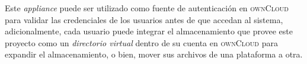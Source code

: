 \begin{itemize}
Este \textsl{appliance} puede ser utilizado como fuente de autenticaci\'{o}n en \textsc{ownCloud} para validar las credenciales de los usuarios antes de que accedan al sistema, adicionalmente, cada usuario puede integrar el almacenamiento que provee este proyecto como un \textsl{directorio virtual} dentro de su cuenta en \textsc{ownCloud} para expandir el almacenamiento, o bien, mover sus archivos de una plataforma a otra.

%

\end{itemize}

